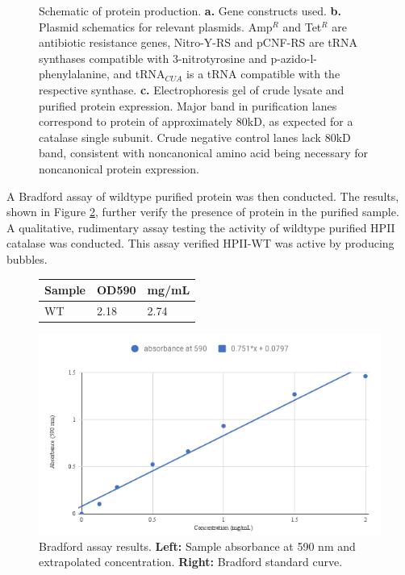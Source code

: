 \documentclass[journal=jacsat,manuscript=article]{achemso}
\begin{document}
\begin{figure}[h!]
\begin{subfigure}{\textwidth}
  \end{subfigure}
  \caption{Schematic of protein production. \textbf{a.} Gene constructs used. \textbf{b.} Plasmid schematics for relevant plasmids. Amp$^R$ and Tet$^R$ are antibiotic resistance genes, Nitro-Y-RS and pCNF-RS are tRNA synthases compatible with 3-nitrotyrosine and p-azido-l-phenylalanine, and tRNA$_{CUA}$ is a tRNA compatible with the respective synthase. \textbf{c.} Electrophoresis gel of crude lysate and purified protein expression. Major band in purification lanes correspond to protein of approximately 80kD, as expected for a catalase single subunit. Crude negative control lanes lack 80kD band, consistent with noncanonical amino acid being necessary for noncanonical protein expression.}
\label{fig:pure-gel}
\end{figure}

A Bradford assay of wildtype purified protein was then conducted. The results, shown in Figure \ref{fig:bradford-assay}, further verify the presence of protein in the purified sample.\\

A qualitative, rudimentary assay testing the activity of wildtype purified HPII catalase was conducted. This assay verified HPII-WT was active by producing bubbles.\\

\begin{figure}[h!]
  \centering
  \begin{minipage}{.4\textwidth}
    \begin{tabular}{lll}
      \hline
      Sample  & OD590 & mg/mL  \\
      \hline
      WT        & 2.18 & 2.74\\
      \hline
    \end{tabular}
  \end{minipage}
  \begin{minipage}{.59\textwidth}
    \includegraphics[width=\linewidth]{figures/bradford-standard-curve}
  \end{minipage}
  \caption{Bradford assay results. \textbf{Left:} Sample absorbance at 590 nm and extrapolated concentration. \textbf{Right:} Bradford standard curve.}
  \label{fig:bradford-assay}
\end{figure}
\end{document}
